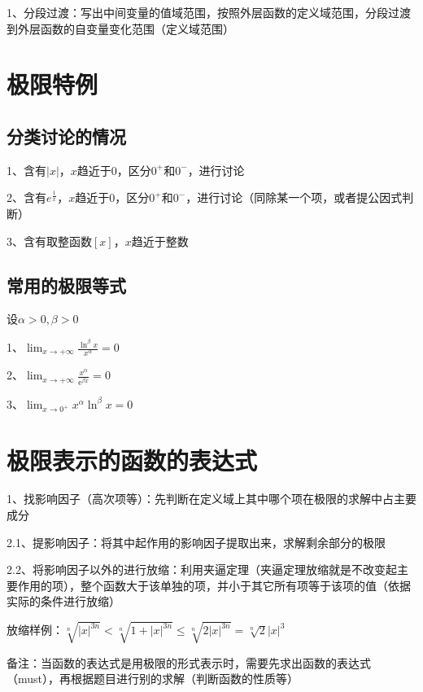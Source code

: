 1、分段过渡：写出中间变量的值域范围，按照外层函数的定义域范围，分段过渡到外层函数的自变量变化范围（定义域范围）

\section{极限特例}



\subsection{分类讨论的情况}

1、含有$|x|$，$x$趋近于0，区分$0^+$和$0^-$，进行讨论

2、含有$e^{\frac{1}{x}}$，$x$趋近于0，区分$0^+$和$0^-$，进行讨论（同除某一个项，或者提公因式判断）

3、含有取整函数$[x]$，$x$趋近于整数



\subsection{常用的极限等式}

设$\alpha>0, \beta>0$

1、$\lim _{x \rightarrow+\infty} \frac{\ln ^{\beta} x}{x^{\alpha}}=0$

2、$\lim _{x \rightarrow+\infty} \frac{x^{\alpha}}{\mathrm{e}^{\beta x}}=0$

3、$\lim _{x \rightarrow 0^{+}} x^{\alpha} \ln ^{\beta} x=0$

\section{极限表示的函数的表达式}

1、找影响因子（高次项等）：先判断在定义域上其中哪个项在极限的求解中占主要成分

2.1、提影响因子：将其中起作用的影响因子提取出来，求解剩余部分的极限

2.2、将影响因子以外的进行放缩：利用夹逼定理（夹逼定理放缩就是不改变起主要作用的项），整个函数大于该单独的项，并小于其它所有项等于该项的值（依据实际的条件进行放缩）

放缩样例：$\sqrt[n]{|x|^{3 n}}<\sqrt[n]{1+|x|^{3 n}} \leqslant \sqrt[n]{2|x|^{3 n}}=\sqrt[n]{2}|x|^{3}$

备注：当函数的表达式是用极限的形式表示时，需要先求出函数的表达式（must），再根据题目进行别的求解（判断函数的性质等）

